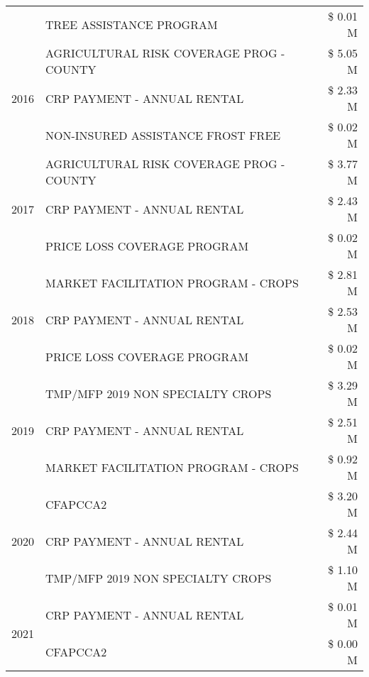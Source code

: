 \begin{tabular}{llr}
 & TREE ASSISTANCE PROGRAM & \$ 0.01 M \\
\cline{1-3}
\multirow[t]{3}{*}{2016} & AGRICULTURAL RISK COVERAGE PROG - COUNTY      & \$ 5.05 M \\
 & CRP PAYMENT - ANNUAL RENTAL                   & \$ 2.33 M \\
 & NON-INSURED ASSISTANCE FROST FREE             & \$ 0.02 M \\
\cline{1-3}
\multirow[t]{3}{*}{2017} & AGRICULTURAL RISK COVERAGE PROG - COUNTY & \$ 3.77 M \\
 & CRP PAYMENT - ANNUAL RENTAL & \$ 2.43 M \\
 & PRICE LOSS COVERAGE PROGRAM & \$ 0.02 M \\
\cline{1-3}
\multirow[t]{3}{*}{2018} & MARKET FACILITATION PROGRAM - CROPS & \$ 2.81 M \\
 & CRP PAYMENT - ANNUAL RENTAL & \$ 2.53 M \\
 & PRICE LOSS COVERAGE PROGRAM & \$ 0.02 M \\
\cline{1-3}
\multirow[t]{3}{*}{2019} & TMP/MFP 2019 NON SPECIALTY CROPS & \$ 3.29 M \\
 & CRP PAYMENT - ANNUAL RENTAL & \$ 2.51 M \\
 & MARKET FACILITATION PROGRAM - CROPS & \$ 0.92 M \\
\cline{1-3}
\multirow[t]{3}{*}{2020} & CFAPCCA2 & \$ 3.20 M \\
 & CRP PAYMENT - ANNUAL RENTAL & \$ 2.44 M \\
 & TMP/MFP 2019 NON SPECIALTY CROPS & \$ 1.10 M \\
\cline{1-3}
\multirow[t]{2}{*}{2021} & CRP PAYMENT - ANNUAL RENTAL & \$ 0.01 M \\
 & CFAPCCA2 & \$ 0.00 M \\
\cline{1-3}
\bottomrule
\end{tabular}
